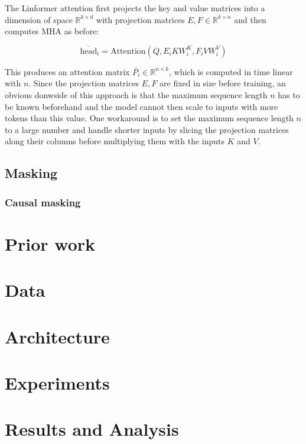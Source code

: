 \documentclass[titlepage]{article}
\begin{document}
The Linformer attention first projects the key and value matrices into a
dimension of space $\mathbb{R}^{k \times d}$ with projection matrices $E, F \in
\mathbb{R}^{k \times n}$ and then computes MHA as before:

\begin{equation}
  \overline{\textrm{head}}_i = \textrm{Attention}\left( Q, E_i K W_i^K, F_i V
    W_i^V \right)
\end{equation}

This produces an attention matrix $\bar{P_i} \in \mathbb{R}^{n \times k}$,
which is computed in time linear with $n$.
Since the projection matrices $E, F$ are fixed in size before training, an
obvious donwside of this approach is that the maximum sequence length $n$ has
to be known beforehand and the model cannot then scale to inputs with more
tokens than this value. One workaround is to set the maximum sequence length
$n$ to a large number and handle shorter inputs by slicing the projection
matrices along their columns before multiplying them with the inputs $K$ and
$V$.

\subsection{Masking}
\subsubsection{Causal masking}

\section{Prior work}

\section{Data}

\section{Architecture}

\section{Experiments}

\section{Results and Analysis}
\end{document}
